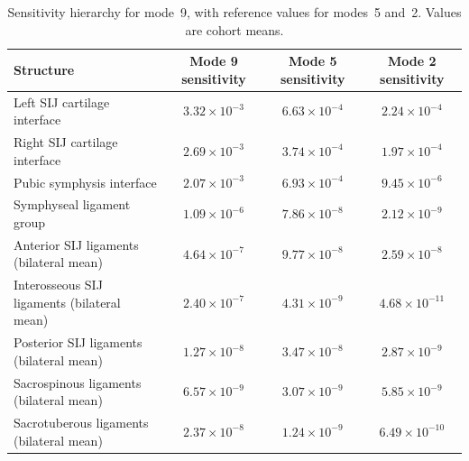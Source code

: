 \documentclass[openacc]{rsproca_new}
\begin{document}
\begin{table}[p]\centering
\caption{Sensitivity hierarchy for mode~9, with reference values for modes~5 and~2. Values are cohort means.}
\begin{tabular}{lccc}\toprule
Structure & Mode 9 sensitivity & Mode 5 sensitivity & Mode 2 sensitivity \\\midrule
Left SIJ cartilage interface & $3.32 \times 10^{-3}$ & $6.63 \times 10^{-4}$ & $2.24 \times 10^{-4}$ \\
Right SIJ cartilage interface & $2.69 \times 10^{-3}$ & $3.74 \times 10^{-4}$ & $1.97 \times 10^{-4}$ \\
Pubic symphysis interface & $2.07 \times 10^{-3}$ & $6.93 \times 10^{-4}$ & $9.45 \times 10^{-6}$ \\
Symphyseal ligament group & $1.09 \times 10^{-6}$ & $7.86 \times 10^{-8}$ & $2.12 \times 10^{-9}$ \\
Anterior SIJ ligaments (bilateral mean) & $4.64 \times 10^{-7}$ & $9.77 \times 10^{-8}$ & $2.59 \times 10^{-8}$ \\
Interosseous SIJ ligaments (bilateral mean) & $2.40 \times 10^{-7}$ & $4.31 \times 10^{-9}$ & $4.68 \times 10^{-11}$ \\
Posterior SIJ ligaments (bilateral mean) & $1.27 \times 10^{-8}$ & $3.47 \times 10^{-8}$ & $2.87 \times 10^{-9}$ \\
Sacrospinous ligaments (bilateral mean) & $6.57 \times 10^{-9}$ & $3.07 \times 10^{-9}$ & $5.85 \times 10^{-9}$ \\
Sacrotuberous ligaments (bilateral mean) & $2.37 \times 10^{-8}$ & $1.24 \times 10^{-9}$ & $6.49 \times 10^{-10}$ \\
\bottomrule\end{tabular}\end{table}
\end{document}

